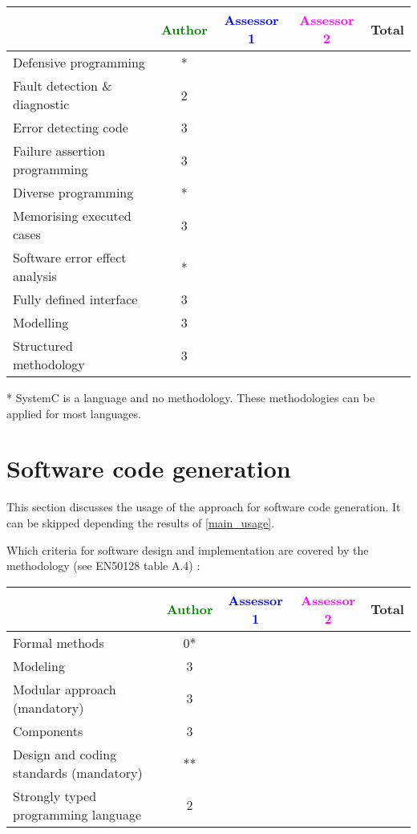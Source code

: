 \begin{tabular}{|l | c | c | c | c|}
\hline
& \textcolor{green}{Author} & \textcolor{blue}{Assessor 1} & \textcolor{magenta}{Assessor 2} & Total \\
\hline
Defensive programming  &* & & &  \\
\hline 
Fault detection \& diagnostic  &2 & & &  \\
\hline
Error detecting code  &3 & & &  \\
\hline
Failure assertion programming &3 & & &  \\
\hline
Diverse programming &* & & &  \\
\hline
Memorising executed cases &3 & & &  \\
\hline
Software error effect analysis &* & & &  \\
\hline
Fully defined interface &3 & & &  \\
\hline
Modelling  &3 & & &  \\
\hline
Structured methodology &3 & & &  \\
\hline
\end{tabular}

\begin{author_comment}
 * SystemC is a language and no methodology. These methodologies can be applied for most languages.
\end{author_comment}

\section{Software code generation}
This section discusses the usage of the approach for software code generation.
It can be skipped depending the results of \ref{main_usage}.

Which criteria for software design and implementation are covered by the methodology
(see EN50128 table A.4) :

\begin{tabular}{|l | c | c | c | c|}
\hline
& \textcolor{green}{Author} & \textcolor{blue}{Assessor 1} & \textcolor{magenta}{Assessor 2} & Total \\
\hline
Formal methods  &0* & & &  \\
\hline 
Modeling  &3 & & &  \\
\hline
Modular approach (mandatory) &3 & & &  \\
\hline
Components &3 & & &  \\
\hline
Design and coding standards (mandatory) &** & & &  \\
\hline
Strongly typed programming language &2 & & &  \\
\hline

\end{tabular}

